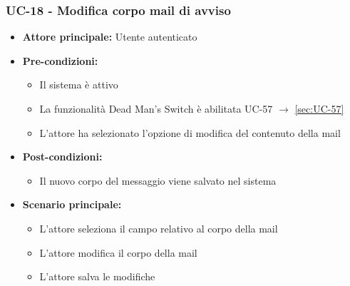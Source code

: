 \documentclass[a4paper,12pt]{article}
\begin{document}
\subsubsection{UC-18 - Modifica corpo mail di avviso} \label{sec:UC-18}
\begin{itemize}
    \item \textbf{Attore principale:} Utente autenticato
    \item \textbf{Pre-condizioni:}
    \begin{itemize}
        \item Il sistema è attivo
        \item La funzionalità Dead Man's Switch è abilitata UC-57 $\rightarrow$ \ref{sec:UC-57}
        \item L'attore ha selezionato l'opzione di modifica del contenuto della mail
    \end{itemize}
    \item \textbf{Post-condizioni:}
    \begin{itemize}
        \item Il nuovo corpo del messaggio viene salvato nel sistema
    \end{itemize}
    \item \textbf{Scenario principale:} 
    \begin{itemize}
        \item L'attore seleziona il campo relativo al corpo della mail
        \item L'attore modifica il corpo della mail
        \item L'attore salva le modifiche
    \end{itemize}
\end{itemize}
\end{document}
